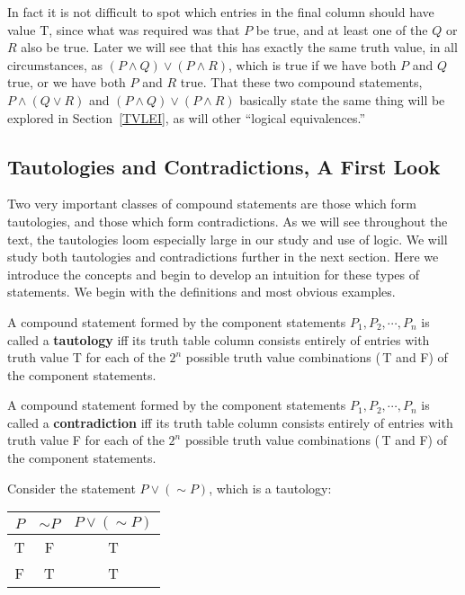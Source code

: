 In fact it is not difficult to spot which entries in the final
column should have value T, since what was required was that
$P$ be true, and at least one of the $Q$ or $R$ also be true.
Later we will see that this has exactly the same truth value, in
all circumstances, as $(P\wedge Q)\vee(P\wedge R)$, which is 
true if we have both $P$ and $Q$ true, or we have both $P$ and $R$
true.  That these two compound statements,
$P\wedge(Q\vee R)$ and $(P\wedge Q)\vee(P\wedge R)$ basically state
the same thing will be explored in Section~\ref{TVLEI}, as will
other ``logical equivalences.''




\subsection{Tautologies and Contradictions, A  First Look}

Two very important classes of compound statements are
those which form tautologies, and those which form
contradictions.  As we will see throughout the text, the tautologies 
loom especially large in our study and use of logic.
We will study both tautologies and contradictions further
in the next section.  Here we introduce the concepts and
begin to develop an intuition for these types of statements.
We begin with the definitions and most obvious examples.


\begin{definition} A compound statement formed by
the component statements $P_1, P_2,\cdots, P_n$
is called a 
{\bf tautology} iff its truth table column consists 
entirely of entries with truth value {\rm T} for each of the 
$2^n$ possible truth value combinations 
(\,{\rm T} and {\rm F}) of the component statements.\end{definition}
\begin{definition} A compound statement  formed by
the component statements $P_1, P_2,\cdots, P_n$
is called a 
{\bf contradiction} iff its truth table column consists 
 entirely of entries with truth value {\rm F} for each of 
the $2^n$  possible truth value combinations 
(\,{\rm T} and {\rm F}) of the component statements.\end{definition}
\bex Consider the statement $P\vee(\sim P)$, which is a 
tautology:

\begin{center}
{\rm
\begin{tabular}{|c||c|c|}
\hline
$P$ &$\sim P$& $P\vee(\sim P)$ \\
\hline
T&F&T\\ F&T&T\\
\hline\end{tabular}
}\end{center}
\label{taut1}
\eex



